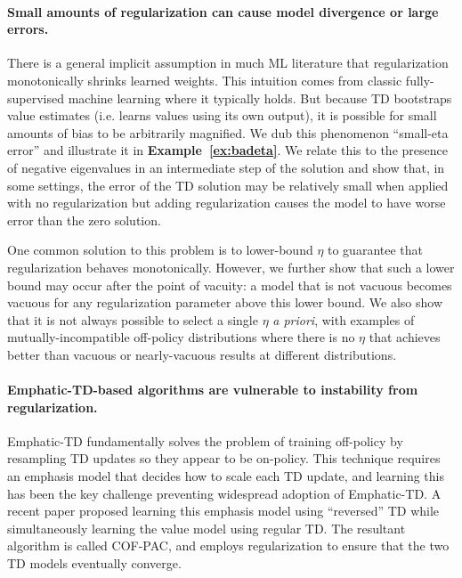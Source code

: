 \paragraph{Small amounts of regularization can cause model divergence or large errors. }
There is a general implicit assumption in much ML literature that regularization monotonically shrinks learned weights. This intuition comes from classic fully-supervised machine learning where it typically holds. But because TD bootstraps value estimates (i.e. learns values using its own output), it is possible for small amounts of bias to be arbitrarily magnified. We dub this phenomenon ``small-eta error'' and illustrate it in \textbf{Example~\ref{ex:badeta}}. We relate this to the presence of negative eigenvalues in an intermediate step of the solution and %
show that, in some settings, the error of the TD solution may be relatively small when applied with no regularization but adding regularization causes the model to have worse error than the zero solution.

One common solution to this problem is to lower-bound $\eta$ to guarantee that regularization behaves monotonically. However, we further show that such a lower bound may occur after the point of vacuity: a model that is not vacuous becomes vacuous for any regularization parameter above this lower bound. We also show that it is not always possible to select a single $\eta$ \emph{a priori}, with examples of mutually-incompatible off-policy distributions where there is no $\eta$ that achieves better than vacuous or nearly-vacuous results at different distributions.


\paragraph{Emphatic-TD-based algorithms are vulnerable to instability from regularization.  }
Emphatic-TD \cite{sutton2016emphatic} fundamentally solves the problem of training off-policy by resampling TD updates so they appear to be on-policy. This technique requires an emphasis model that decides how to scale each TD update, and learning this has been the key challenge preventing widespread adoption of Emphatic-TD. A recent paper \cite{zhang2020provably} proposed learning this emphasis model using ``reversed'' TD while simultaneously learning the value model using regular TD. The resultant algorithm is called COF-PAC, and employs regularization to ensure that the two TD models eventually converge.

